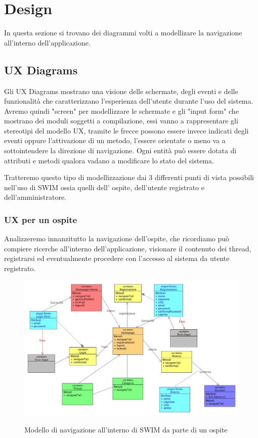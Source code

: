 \section{Design}

In questa sezione si trovano dei diagrammi volti a modellizare la navigazione all'interno dell'applicazione.

\subsection{UX Diagrams}

Gli UX Diagrams mostrano una visione delle schermate, degli eventi e delle funzionalità che caratterizzano l'esperienza dell'utente durante l'uso del sistema. Avremo quindi "screen" per modellizzare le schermate e gli "input form" che mostrano dei moduli soggetti a compilazione, essi vanno a rappresentare gli stereotipi del modello UX, tramite le frecce possono essere invece indicati degli eventi oppure l'attivazione di un metodo, l'essere orientate o meno va a sottointendere la direzione di navigazione. 
Ogni entità può essere dotata di attributi e metodi qualora vadano a modificare lo stato del sistema. 

Tratteremo questo tipo di modellizzazione dai 3 differenti punti di vista possibili nell'uso di SWIM ossia quelli dell' ospite, dell'utente registrato e dell'amministratore.

\subsubsection{UX per un ospite}

Analizzeremo innanzitutto la navigazione dell'ospite, che ricordiamo può compiere ricerche all'interno dell'applicazione, visionare il contenuto dei thread, registrarsi ed eventualmente procedere con l'accesso al sistema da utente registrato. 

\begin{figure} [!hbtp]
\centering
\includegraphics[scale=0.40]{uxEsperienzaOspite.jpg} \\
\caption{\label{uxOspite} Modello di navigazione all'interno di SWIM da parte di un ospite }
\end{figure}

